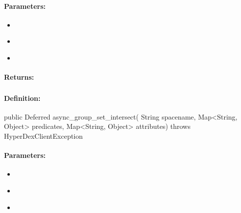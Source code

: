 \paragraph{Parameters:}
\begin{itemize}[noitemsep]
\item {}\\

\item {}\\

\item {}\\

\end{itemize}

\paragraph{Returns:}


\pagebreak
\subsubsection{}
\label{api:java:async_group_set_intersect}


\paragraph{Definition:}
\begin{javacode}
public Deferred async_group_set_intersect(
        String spacename,
        Map<String, Object> predicates,
        Map<String, Object> attributes) throws HyperDexClientException
\end{javacode}

\paragraph{Parameters:}
\begin{itemize}[noitemsep]
\item {}\\

\item {}\\

\item {}\\

\end{itemize}

